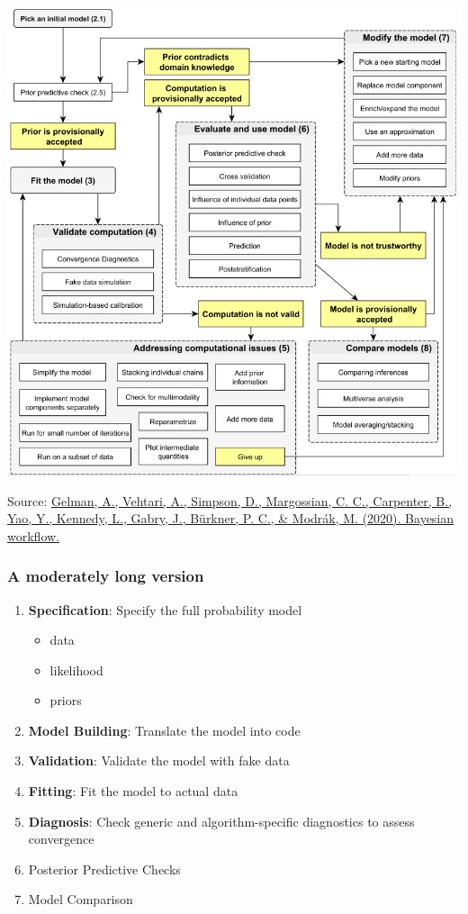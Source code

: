 \documentclass[
  11pt,
]{article}
\providecommand{\tightlist}{%
  \setlength{\itemsep}{0pt}\setlength{\parskip}{0pt}}
\begin{document}
\begin{center}\includegraphics[width=0.9\linewidth]{images/workflow} \end{center}

Source: \href{https://arxiv.org/abs/2011.01808}{Gelman, A., Vehtari, A., Simpson, D., Margossian, C. C., Carpenter, B., Yao, Y., Kennedy, L., Gabry, J., Bürkner, P. C., \& Modrák, M. (2020). Bayesian workflow.}

\hypertarget{a-moderately-long-version}{%
\subsubsection{A moderately long version}\label{a-moderately-long-version}}

\begin{enumerate}
\def\labelenumi{\arabic{enumi}.}
\tightlist
\item
  \textbf{Specification}: Specify the full probability model

  \begin{itemize}
  \tightlist
  \item
    data
  \item
    likelihood
  \item
    priors
  \end{itemize}
\item
  \textbf{Model Building}: Translate the model into code
\item
  \textbf{Validation}: Validate the model with fake data
\item
  \textbf{Fitting}: Fit the model to actual data
\item
  \textbf{Diagnosis}: Check generic and algorithm-specific diagnostics to assess convergence
\item
  Posterior Predictive Checks
\item
  Model Comparison
\end{enumerate}
\end{document}
